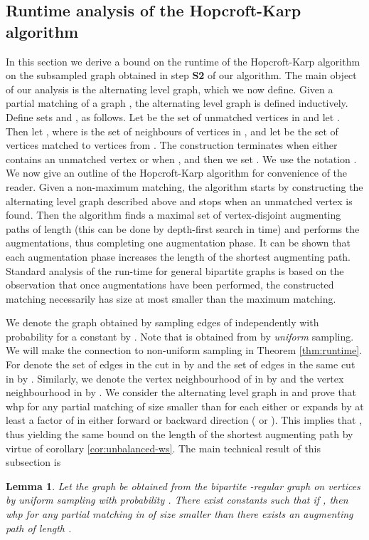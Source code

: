 \documentclass[11pt]{article}
\newtheorem{lemma}[theorem]{Lemma}
\begin{document}
\subsection{Runtime analysis of the Hopcroft-Karp algorithm}
In this section we derive a bound on the runtime of the Hopcroft-Karp algorithm on the subsampled graph obtained in step \textbf{S2} of our algorithm.
The main object of our analysis is the alternating level graph, which we now define. Given a partial matching of a graph , the alternating level graph is defined inductively. Define sets  and ,  as follows. Let  be the set of unmatched vertices in  and let . Then let , where   is the set of neighbours of vertices in , and let  be the set of vertices matched to vertices from . The construction terminates when either  contains an unmatched vertex or when , and then we set . We use the notation . 
We now give an outline of the Hopcroft-Karp algorithm for convenience of the reader. Given a non-maximum matching, the algorithm starts by constructing the alternating level graph described above and stops when an unmatched vertex is found. Then the algorithm finds a maximal set of vertex-disjoint augmenting paths of length  (this can be done by depth-first search in  time) and performs the augmentations, thus completing one augmentation phase. It can be shown that each augmentation phase increases the length of the shortest augmenting path. Standard analysis of the run-time for general bipartite graphs is based on the observation that once  augmentations have been performed, the constructed matching necessarily has size at most  smaller than the maximum matching.  

We denote the graph obtained by sampling edges of  independently with probability  for a constant  by . Note that  is obtained from  by \textit{uniform} sampling. We will make the connection to non-uniform sampling in Theorem \ref{thm:runtime}. For  denote the set of edges in the cut  in  by  and the set of edges in the same cut in  by .
Similarly, we denote the vertex neighbourhood of  in  by  and the vertex neighbourhood in  by .
 We consider the alternating level graph in  and prove that whp for any partial matching of size smaller than  for
each  either  or  expands by at least a factor of  in
either forward or backward direction ( or ). This implies that , thus yielding the same bound on the length of
the shortest augmenting path by virtue of corollary \ref{cor:unbalanced-ws}. The main technical result of this subsection is

\begin{lemma} \label{lm:main} Let the graph  be obtained from the
  bipartite -regular graph  on  vertices by uniform sampling with
  probability . There exist constants  such that if , then whp for any partial matching in  of size
  smaller than  there exists an augmenting path of length
  .
\end{lemma}
\end{document}
